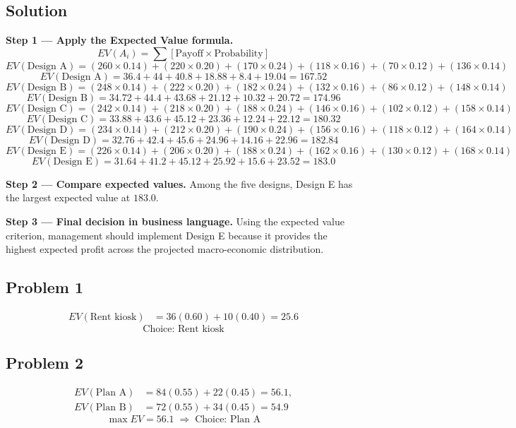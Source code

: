 \begin{ExamProblems}
		\subsection*{Solution}
		\textbf{Step 1 --- Apply the Expected Value formula.}
		\[
		EV(A_i)=\sum [\text{Payoff}\times\text{Probability}]
		\]
		\[
		EV(\text{Design A})=(260\times0.14)+(220\times0.20)+(170\times0.24)+(118\times0.16)+(70\times0.12)+(136\times0.14)
		\]
		\[
		EV(\text{Design A})=36.4+44+40.8+18.88+8.4+19.04=167.52
		\]
		\[
		EV(\text{Design B})=(248\times0.14)+(222\times0.20)+(182\times0.24)+(132\times0.16)+(86\times0.12)+(148\times0.14)
		\]
		\[
		EV(\text{Design B})=34.72+44.4+43.68+21.12+10.32+20.72=174.96
		\]
		\[
		EV(\text{Design C})=(242\times0.14)+(218\times0.20)+(188\times0.24)+(146\times0.16)+(102\times0.12)+(158\times0.14)
		\]
		\[
		EV(\text{Design C})=33.88+43.6+45.12+23.36+12.24+22.12=180.32
		\]
		\[
		EV(\text{Design D})=(234\times0.14)+(212\times0.20)+(190\times0.24)+(156\times0.16)+(118\times0.12)+(164\times0.14)
		\]
		\[
		EV(\text{Design D})=32.76+42.4+45.6+24.96+14.16+22.96=182.84
		\]
		\[
		EV(\text{Design E})=(226\times0.14)+(206\times0.20)+(188\times0.24)+(162\times0.16)+(130\times0.12)+(168\times0.14)
		\]
		\[
		EV(\text{Design E})=31.64+41.2+45.12+25.92+15.6+23.52=183.0
		\]
		
		\textbf{Step 2 --- Compare expected values.}
		Among the five designs, Design E has the largest expected value at $183.0$.
		
		\textbf{Step 3 --- Final decision in business language.}
		Using the expected value criterion, management should implement Design E because it provides the highest expected profit across the projected macro-economic distribution.
		\end{ExamProblems}

	\subsection*{Problem 1}
	\[
	\begin{aligned}
	EV(\text{Rent kiosk}) &= 36(0.60)+10(0.40)=25.6
	\end{aligned}
	\]
	\[
	\text{Choice: Rent kiosk}
	\]

	\subsection*{Problem 2}
	\[
	\begin{aligned}
	EV(\text{Plan A}) &= 84(0.55)+22(0.45)=56.1,\\
	EV(\text{Plan B}) &= 72(0.55)+34(0.45)=54.9
	\end{aligned}
	\]
	\[
	\max EV = 56.1 \;\Rightarrow\; \text{Choice: Plan A}
	\]

